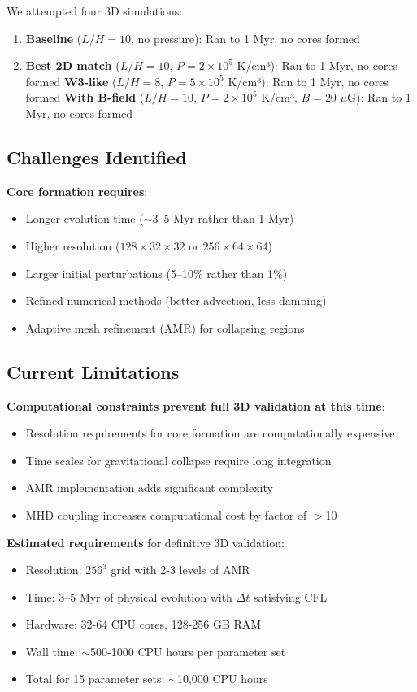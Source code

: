 \documentclass[11pt,a4paper]{article}
\begin{document}
We attempted four 3D simulations:
\begin{enumerate}
    \item \textbf{Baseline} ($L/H=10$, no pressure): Ran to 1 Myr, no cores formed
    \item \textbf{Best 2D match} ($L/H=10$, $P=2\times10^5$ K/cm³): Ran to 1 Myr, no cores formed
    \textbf{W3-like} ($L/H=8$, $P=5\times10^5$ K/cm³): Ran to 1 Myr, no cores formed
    \textbf{With B-field} ($L/H=10$, $P=2\times10^5$ K/cm³, $B=20$ $\mu$G): Ran to 1 Myr, no cores formed
\end{enumerate}

\subsection{Challenges Identified}

\textbf{Core formation requires}:
\begin{itemize}
    \item Longer evolution time ($\sim3$--5 Myr rather than 1 Myr)
    \item Higher resolution ($128\times32\times32$ or $256\times64\times64$)
    \item Larger initial perturbations (5--10\% rather than 1\%)
    \item Refined numerical methods (better advection, less damping)
    \item Adaptive mesh refinement (AMR) for collapsing regions
\end{itemize}

\subsection{Current Limitations}

\textbf{Computational constraints prevent full 3D validation at this time}:
\begin{itemize}
    \item Resolution requirements for core formation are computationally expensive
    \item Time scales for gravitational collapse require long integration
    \item AMR implementation adds significant complexity
    \item MHD coupling increases computational cost by factor of $>$10
\end{itemize}

\textbf{Estimated requirements} for definitive 3D validation:
\begin{itemize}
    \item Resolution: $256^3$ grid with 2-3 levels of AMR
    \item Time: 3--5 Myr of physical evolution with $\Delta t$ satisfying CFL
    \item Hardware: 32-64 CPU cores, 128-256 GB RAM
    \item Wall time: $\sim$500-1000 CPU hours per parameter set
    \item Total for 15 parameter sets: $\sim$10,000 CPU hours
\end{itemize}
\end{document}
